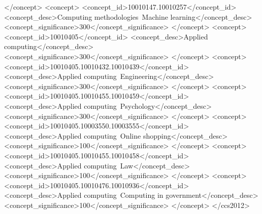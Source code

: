 \begin{CCSXML}
</concept>
<concept>
<concept_id>10010147.10010257</concept_id>
<concept_desc>Computing methodologies~Machine learning</concept_desc>
<concept_significance>300</concept_significance>
</concept>
<concept>
<concept_id>10010405</concept_id>
<concept_desc>Applied computing</concept_desc>
<concept_significance>300</concept_significance>
</concept>
<concept>
<concept_id>10010405.10010432.10010439</concept_id>
<concept_desc>Applied computing~Engineering</concept_desc>
<concept_significance>300</concept_significance>
</concept>
<concept>
<concept_id>10010405.10010455.10010459</concept_id>
<concept_desc>Applied computing~Psychology</concept_desc>
<concept_significance>300</concept_significance>
</concept>
<concept>
<concept_id>10010405.10003550.10003555</concept_id>
<concept_desc>Applied computing~Online shopping</concept_desc>
<concept_significance>100</concept_significance>
</concept>
<concept>
<concept_id>10010405.10010455.10010458</concept_id>
<concept_desc>Applied computing~Law</concept_desc>
<concept_significance>100</concept_significance>
</concept>
<concept>
<concept_id>10010405.10010476.10010936</concept_id>
<concept_desc>Applied computing~Computing in government</concept_desc>
<concept_significance>100</concept_significance>
</concept>
</ccs2012>
\end{CCSXML}

